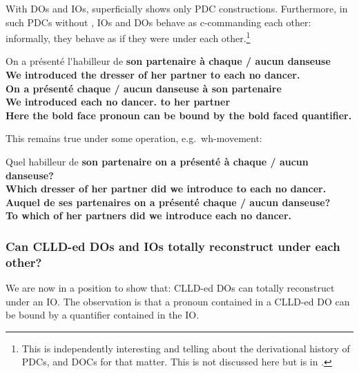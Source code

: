 \documentclass[output=paper]{langsci/langscibook}
\begin{document}
With \glspl{DO} and \glspl{IO},  superficially shows only \gls{PDC} constructions.
Furthermore, in such \glspl{PDC} without  , IOs and DOs
behave as c-commanding each other: informally, they behave as if they were
under each other.\footnote{This is independently interesting and telling about
the derivational history of \glspl{PDC}, and \glspl{DOC} for that matter. This
is  not discussed here but is in  \citealp{Sportiche2017}.}

\ea \label{doio1}
\sn
\gll On a  pr\'{e}sent\'{e} l\'{}habilleur de \bf{son} partenaire \`{a} \textbf{chaque} / \textbf{aucun} danseuse\\
We {} introduced {the dresser} of her partner to each {} no dancer.\glossF{} \\
\sn
\gll On a  pr\'{e}sent\'{e} \textbf{chaque} / \textbf{aucun} danseuse \`{a} \bf{son} partenaire\\
We {} introduced each {} no dancer.\glossF{} to her partner\\
\z
\z
%
Here the bold face pronoun can be bound by the bold faced quantifier.

This remains true under some  operation, e.g.\ wh-movement:

\ea \label{doio2}
\sn
\gll Quel habilleur de \bf{son} partenaire on a  pr\'{e}sent\'{e}  \`{a} \textbf{chaque} / \textbf{aucun} danseuse?\\
  Which dresser of her {partner did} we {} introduce to each {} no dancer.\glossF{} \\
\sn
\gll  Auquel de  \bf{ses} partenaires on a  pr\'{e}sent\'{e} \textbf{chaque} / \textbf{aucun} danseuse?\\
{To which} of her {partners did} we {} introduce each {} no dancer.\glossF{} \\
\z
\z

\subsubsection{Can CLLD-ed DOs and IOs totally reconstruct
under each other?}\label{frozenscope}

We are now in a position to show that: \gls{CLLD}-ed \glspl{DO} can
totally reconstruct under an  IO. The observation is that a pronoun contained
in a \gls{CLLD}-ed \gls{DO} can be bound by a quantifier contained in the
\gls{IO}.
\end{document}
